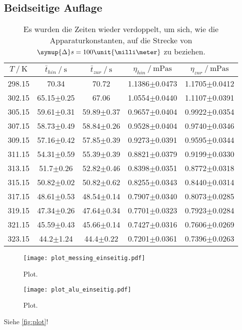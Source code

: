 \subsection{Beidseitige Auflage}
\label{sec:Beidseitige Auflage}



\begin{table}[H]
  \centering
  \caption{Es wurden die Zeiten wieder verdoppelt, um sich, wie die Apparaturkonstanten, auf die Strecke 
  von $\symup{\Delta}s=100\unit{\milli\meter}$ zu beziehen.}
  \begin{tabular}{ccccc}
    \toprule
    {$T \mathbin{/} \unit{\kelvin}$} &
    {$\bar{t}_{hin} \mathbin{/} \unit{\second}$} &
    {$\bar{t}_{zur} \mathbin{/} \unit{\second}$} &
    {$\eta_{hin} \mathbin{/} \unit{\milli\pascal\second}$} &
    {$\eta_{zur} \mathbin{/} \unit{\milli\pascal\second}$} \\
    \midrule
    298.15 & 70.34          & 70.72          & 1.1386$\pm$0.0473 & 1.1705$\pm$0.0412 \\
    302.15 & 65.15$\pm$0.25 & 67.06          & 1.0554$\pm$0.0440 & 1.1107$\pm$0.0391 \\
    305.15 & 59.61$\pm$0.31 & 59.89$\pm$0.37 & 0.9657$\pm$0.0404 & 0.9922$\pm$0.0354 \\
    307.15 & 58.73$\pm$0.49 & 58.84$\pm$0.26 & 0.9528$\pm$0.0404 & 0.9740$\pm$0.0346 \\
    309.15 & 57.16$\pm$0.42 & 57.85$\pm$0.39 & 0.9273$\pm$0.0391 & 0.9595$\pm$0.0344 \\
    311.15 & 54.31$\pm$0.59 & 55.39$\pm$0.39 & 0.8821$\pm$0.0379 & 0.9199$\pm$0.0330 \\
    313.15 & 51.7$\pm$0.26  & 52.82$\pm$0.46 & 0.8398$\pm$0.0351 & 0.8772$\pm$0.0318 \\
    315.15 & 50.82$\pm$0.02 & 50.82$\pm$0.62 & 0.8255$\pm$0.0343 & 0.8440$\pm$0.0314 \\
    317.15 & 48.61$\pm$0.53 & 48.54$\pm$0.14 & 0.7907$\pm$0.0340 & 0.8073$\pm$0.0285 \\
    319.15 & 47.34$\pm$0.26 & 47.64$\pm$0.34 & 0.7701$\pm$0.0323 & 0.7923$\pm$0.0284 \\
    321.15 & 45.59$\pm$0.43 & 45.66$\pm$0.14 & 0.7427$\pm$0.0316 & 0.7606$\pm$0.0269 \\
    323.15 & 44.2$\pm$1.24  & 44.4$\pm$0.22  & 0.7201$\pm$0.0361 & 0.7396$\pm$0.0263 \\
    \bottomrule
  \end{tabular}
  \label{tab:Tabelle3}
\end{table}










\begin{figure}
  \centering
  \texttt{[image: plot\_messing\_einseitig.pdf]}
  \caption{Plot.}
  \label{fig:plot}
\end{figure}

\begin{figure}
  \centering
  \texttt{[image: plot\_alu\_einseitig.pdf]}
  \caption{Plot.}
  \label{fig:plot_alu_einseitig}
\end{figure}


Siehe \autoref{fig:plot}! 
